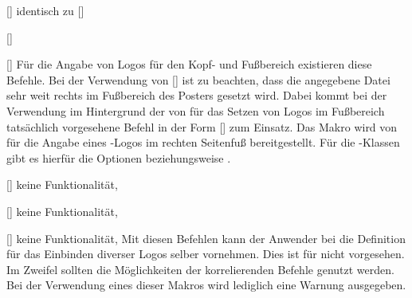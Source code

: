 \begin{Bundle*}{}
\begin{Declaration}{[]}{%
  identisch zu []
}
\begin{Declaration}{[]}{%
}
\begin{Declaration}{[]}{%
}
\printdeclarationlist%
%
Für die Angabe von Logos für den Kopf- und Fußbereich existieren diese Befehle. 
Bei der Verwendung von [] ist zu 
beachten, dass die angegebene Datei sehr weit rechts im Fußbereich des Posters 
gesetzt wird. Dabei kommt bei der Verwendung im Hintergrund der von \TUDScript 
für das Setzen von Logos im Fußbereich tatsächlich vorgesehene Befehl in der 
Form []
zum Einsatz. Das Makro  wird von  für 
die Angabe eines \DDC-Logos im rechten Seitenfuß bereitgestellt. Für die 
\TUDScript-Klassen gibt es hierfür die Optionen  beziehungsweise 
.
\end{Declaration}
\end{Declaration}
\end{Declaration}

\begin{Declaration}{[]}{%
  keine Funktionalität, 
}
\begin{Declaration}{[]}{%
  keine Funktionalität, 
}
\begin{Declaration}{[]}{%
  keine Funktionalität, %
}
\printdeclarationlist%
%
Mit diesen Befehlen kann der Anwender bei  die Definition 
für das Einbinden diverser Logos selber vornehmen. Dies ist für \TUDScript 
nicht vorgesehen. Im Zweifel sollten die Möglichkeiten der korrelierenden 
Befehle genutzt werden. Bei der Verwendung eines dieser Makros wird lediglich 
eine Warnung ausgegeben.
\end{Declaration}
\end{Declaration}
\end{Declaration}


\end{Bundle*}
